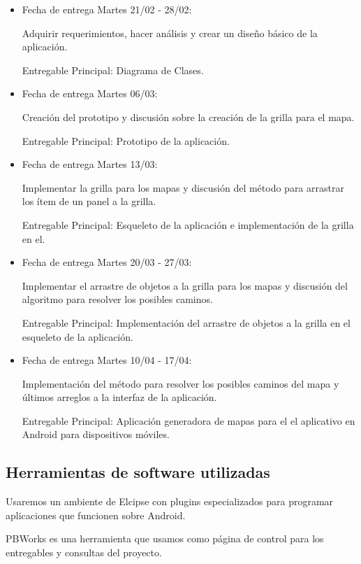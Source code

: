 \documentclass[letterpaper,11pt]{article}
\begin{document}
	\begin{itemize}
		\item Fecha de entrega Martes 21/02 - 28/02: 
		
		Adquirir requerimientos, hacer análisis y crear un diseño 
		básico de la aplicación. 
		
		Entregable Principal: Diagrama de Clases.

		\item Fecha de entrega Martes 06/03: 
		
		Creación del prototipo y discusión sobre la creación de la 
		grilla para el mapa.
		
		Entregable Principal: Prototipo de la aplicación.

		\item Fecha de entrega Martes 13/03: 
		
		Implementar la grilla para los mapas y discusión del 
		método para arrastrar los ítem de un panel a la grilla.
		
		Entregable Principal: Esqueleto de la aplicación e 
		implementación de la grilla en el.
		
		\item Fecha de entrega Martes 20/03 - 27/03: 
		
		Implementar el arrastre de objetos a la grilla para los mapas 
		y discusión del	algoritmo para resolver los posibles caminos.
		
		Entregable Principal: Implementación del arrastre de objetos a 
		la grilla en el esqueleto de la aplicación.
		
		\item Fecha de entrega Martes 10/04 - 17/04: 
		
		Implementación del método para resolver los posibles caminos del 
		mapa y últimos arreglos a la interfaz de la aplicación.
		
		Entregable Principal: Aplicación generadora de mapas para el el 
		aplicativo en Android para dispositivos móviles.
				
	\end{itemize}
	
	\subsection{Herramientas de software utilizadas}

	Usaremos un ambiente de Elcipse con plugins especializados para 
	programar aplicaciones que funcionen sobre Android.

	PBWorks es una herramienta que usamos como página de control para los 
	entregables y consultas del proyecto.
	
\end{document}
